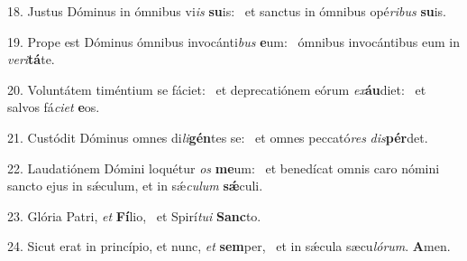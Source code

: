 18. Justus Dóminus in ómnibus vi\textit{is} \textbf{su}is: \ast\  et sanctus in ómnibus opé\textit{ri}\textit{bus} \textbf{su}is.\

19. Prope est Dóminus ómnibus invocánti\textit{bus} \textbf{e}um: \ast\  ómnibus invocántibus eum in \textit{ve}\textit{ri}\textbf{tá}te.\

20. Voluntátem timéntium se fáciet: \dag\  et deprecatiónem eórum \textit{ex}\textbf{áu}diet: \ast\  et salvos fá\textit{ci}\textit{et} \textbf{e}os.\

21. Custódit Dóminus omnes di\textit{li}\textbf{gén}tes se: \ast\  et omnes peccató\textit{res} \textit{dis}\textbf{pér}det.\

22. Laudatiónem Dómini loquétur \textit{os} \textbf{me}um: \ast\  et benedícat omnis caro nómini sancto ejus in sǽculum, et in sǽ\textit{cu}\textit{lum} \textbf{sǽ}culi.\

23. Glória Patri, \textit{et} \textbf{Fí}lio, \ast\  et Spirí\textit{tu}\textit{i} \textbf{Sanc}to.\

24. Sicut erat in princípio, et nunc, \textit{et} \textbf{sem}per, \ast\  et in sǽcula sæcu\textit{ló}\textit{rum}. \textbf{A}men.\

